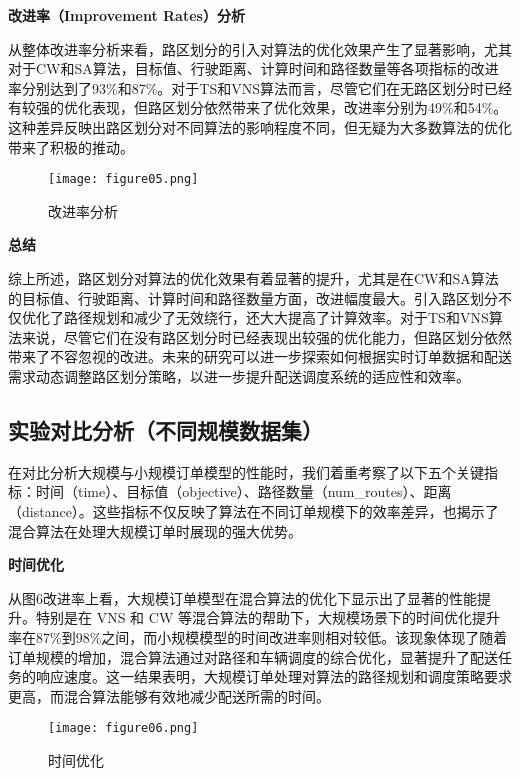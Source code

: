 \documentclass[12pt,a4paper,twoside]{ctexbook}
\begin{document}
\textbf{改进率（Improvement Rates）分析}

从整体改进率分析来看，路区划分的引入对算法的优化效果产生了显著影响，尤其对于CW和SA算法，目标值、行驶距离、计算时间和路径数量等各项指标的改进率分别达到了93\%和87\%。对于TS和VNS算法而言，尽管它们在无路区划分时已经有较强的优化表现，但路区划分依然带来了优化效果，改进率分别为49\%和54\%。这种差异反映出路区划分对不同算法的影响程度不同，但无疑为大多数算法的优化带来了积极的推动。

\begin{figure}[H]
    \centering
    \texttt{[image: figure05.png]} %
    \caption{改进率分析}
    \label{fig:improvement_rates}
\end{figure}

\textbf{总结}

综上所述，路区划分对算法的优化效果有着显著的提升，尤其是在CW和SA算法的目标值、行驶距离、计算时间和路径数量方面，改进幅度最大。引入路区划分不仅优化了路径规划和减少了无效绕行，还大大提高了计算效率。对于TS和VNS算法来说，尽管它们在没有路区划分时已经表现出较强的优化能力，但路区划分依然带来了不容忽视的改进。未来的研究可以进一步探索如何根据实时订单数据和配送需求动态调整路区划分策略，以进一步提升配送调度系统的适应性和效率。

\subsection{实验对比分析（不同规模数据集）}

在对比分析大规模与小规模订单模型的性能时，我们着重考察了以下五个关键指标：时间（time）、目标值（objective）、路径数量（num\_routes）、距离（distance）。这些指标不仅反映了算法在不同订单规模下的效率差异，也揭示了混合算法在处理大规模订单时展现的强大优势。

\textbf{时间优化}

从图6改进率上看，大规模订单模型在混合算法的优化下显示出了显著的性能提升。特别是在 VNS 和 CW 等混合算法的帮助下，大规模场景下的时间优化提升率在87\%到98\%之间，而小规模模型的时间改进率则相对较低。该现象体现了随着订单规模的增加，混合算法通过对路径和车辆调度的综合优化，显著提升了配送任务的响应速度。这一结果表明，大规模订单处理对算法的路径规划和调度策略要求更高，而混合算法能够有效地减少配送所需的时间。

\begin{figure}[H]
    \centering
    \texttt{[image: figure06.png]} %
    \caption{时间优化}
    \label{fig:time_optimization}
\end{figure}
\end{document}
